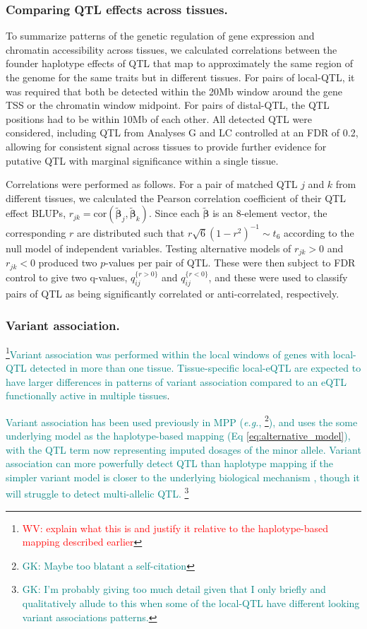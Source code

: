 \documentclass[9pt,twocolumn,twoside]{gsajnl}
\newcommand{\eg}{\emph{e.g.}\xspace}
\newcommand{\bbeta}{\boldsymbol{\beta}}
\newcommand{\blup}{\widetilde{\bbeta}}
\newcommand{\WV}[2]{\textcolor{red}{#1\footnote{\textcolor{red}{WV: #2}}}}
\newcommand{\GK}[2]{\textcolor{teal}{#1\footnote{\textcolor{teal}{GK: #2}}}}
\newcommand{\GKinline}[1]{\textcolor{teal}{#1}}
\begin{document}
\subsubsection{Comparing QTL effects across tissues.}

To summarize patterns of the genetic regulation of gene expression and chromatin accessibility across tissues, we calculated correlations between the founder haplotype effects of QTL that map to approximately the same region of the genome for the same traits but in different tissues. For pairs of local-QTL, it was required that both be detected within the 20Mb window around the gene TSS or the chromatin window midpoint. For pairs of distal-QTL, the QTL positions had to be within 10Mb of each other. All detected QTL were considered, including QTL from Analyses G and LC controlled at an FDR of 0.2, allowing for consistent signal across tissues to provide further evidence for putative QTL with marginal significance within a single tissue.

Correlations were performed as follows. For a pair of matched QTL $j$ and $k$ from different tissues, we calculated the Pearson correlation coefficient of their QTL effect BLUPs, $r_{jk} = \text{cor}(\blup_j, \blup_k)$. Since each $\blup$ is an 8-element vector, the corresponding $r$ are distributed such that $r\sqrt{6}(1 - r^{2})^{-1} \sim t_{6}$ according to the null model of independent variables. Testing alternative models of $r_{jk} > 0$ and $r_{jk} < 0$ produced two $p$-values per pair of QTL. These were then subject to FDR control \citep{Benjamini1995} to give two q-values, $q_{ij}^{\{r > 0\}}$ and $q_{ij}^{\{r < 0\}}$, and these were used to classify pairs of QTL as being significantly correlated or anti-correlated, respectively. 

\subsubsection{Variant association.}

\WV{}{explain what this is and justify it relative to the haplotype-based mapping described earlier}\GKinline{Variant association was performed within the local windows of genes with local-QTL detected in more than one tissue. Tissue-specific local-eQTL are expected to have larger differences in patterns of variant association compared to an eQTL functionally active in multiple tissues}. 

\GKinline{Variant association has been used previously in MPP (\eg, \citealt{Baud2014, Keele2018}\GK{}{Maybe too blatant a self-citation}), and uses the some underlying model as the haplotype-based mapping (Eq \ref{eq:alternative_model}), with the QTL term now representing imputed dosages of the minor allele. Variant association can more powerfully detect QTL than haplotype mapping if the simpler variant model is closer to the underlying biological mechanism \citep{Yalcin2005}, though it will struggle to detect multi-allelic QTL.} \GK{}{I'm probably giving too much detail given that I only briefly and qualitatively allude to this when some of the local-QTL have different looking variant associations patterns.}
\end{document}
